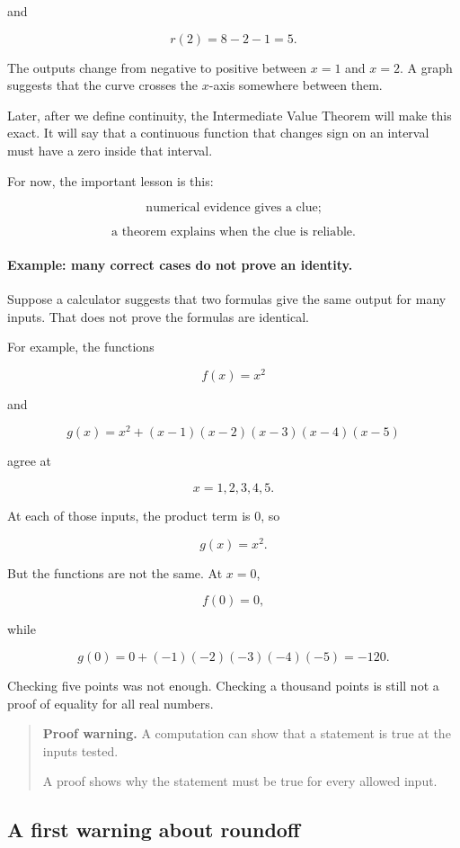 and

\[
r(2)=8-2-1=5.
\]

The outputs change from negative to positive between \(x=1\) and \(x=2\). A graph suggests that the curve crosses the \(x\)-axis somewhere between them.

Later, after we define continuity, the Intermediate Value Theorem will make this exact. It will say that a continuous function that changes sign on an interval must have a zero inside that interval.

For now, the important lesson is this:

\[
\text{numerical evidence gives a clue;}
\]

\[
\text{a theorem explains when the clue is reliable.}
\]

\paragraph{Example: many correct cases do not prove an identity.}
Suppose a calculator suggests that two formulas give the same output for many inputs. That does not prove the formulas are identical.

For example, the functions

\[
f(x)=x^2
\]

and

\[
g(x)=x^2+(x-1)(x-2)(x-3)(x-4)(x-5)
\]

agree at

\[
x=1,2,3,4,5.
\]

At each of those inputs, the product term is \(0\), so

\[
g(x)=x^2.
\]

But the functions are not the same. At \(x=0\),

\[
f(0)=0,
\]

while

\[
g(0)=0+(-1)(-2)(-3)(-4)(-5)=-120.
\]

Checking five points was not enough. Checking a thousand points is still not a proof of equality for all real numbers.

\begin{quote}
\textbf{Proof warning.}
A computation can show that a statement is true at the inputs tested.

A proof shows why the statement must be true for every allowed input.
\end{quote}

\subsection{A first warning about roundoff}
\label{subsec:first-warning-roundoff}

